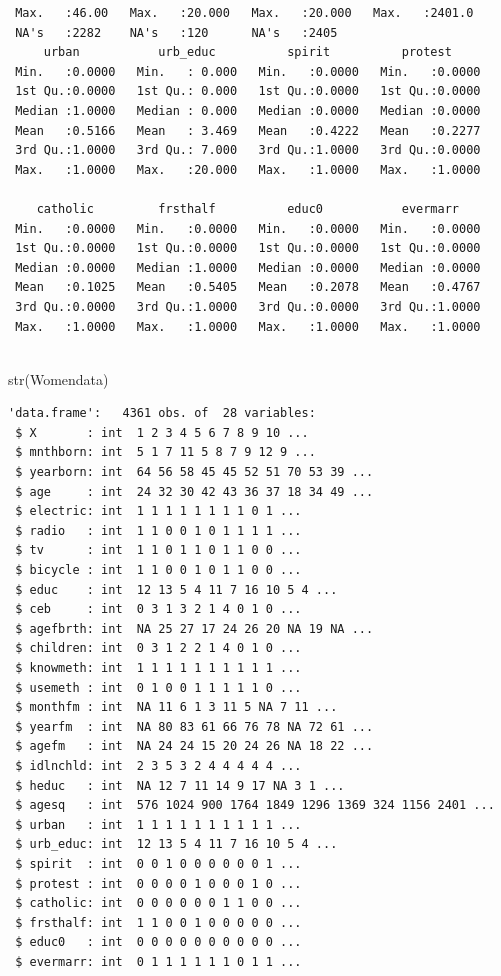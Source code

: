 \documentclass[
  letterpaper,
  DIV=11,
  numbers=noendperiod]{scrartcl}
\newenvironment{Shaded}{\begin{snugshade}}{\end{snugshade}}
\newcommand{\FunctionTok}[1]{\textcolor[rgb]{0.28,0.35,0.67}{#1}}
\newcommand{\NormalTok}[1]{\textcolor[rgb]{0.00,0.23,0.31}{#1}}
\begin{document}
\begin{verbatim}
 Max.   :46.00   Max.   :20.000   Max.   :20.000   Max.   :2401.0  
 NA's   :2282    NA's   :120      NA's   :2405                     
     urban           urb_educ          spirit          protest      
 Min.   :0.0000   Min.   : 0.000   Min.   :0.0000   Min.   :0.0000  
 1st Qu.:0.0000   1st Qu.: 0.000   1st Qu.:0.0000   1st Qu.:0.0000  
 Median :1.0000   Median : 0.000   Median :0.0000   Median :0.0000  
 Mean   :0.5166   Mean   : 3.469   Mean   :0.4222   Mean   :0.2277  
 3rd Qu.:1.0000   3rd Qu.: 7.000   3rd Qu.:1.0000   3rd Qu.:0.0000  
 Max.   :1.0000   Max.   :20.000   Max.   :1.0000   Max.   :1.0000  
                                                                    
    catholic         frsthalf          educ0           evermarr     
 Min.   :0.0000   Min.   :0.0000   Min.   :0.0000   Min.   :0.0000  
 1st Qu.:0.0000   1st Qu.:0.0000   1st Qu.:0.0000   1st Qu.:0.0000  
 Median :0.0000   Median :1.0000   Median :0.0000   Median :0.0000  
 Mean   :0.1025   Mean   :0.5405   Mean   :0.2078   Mean   :0.4767  
 3rd Qu.:0.0000   3rd Qu.:1.0000   3rd Qu.:0.0000   3rd Qu.:1.0000  
 Max.   :1.0000   Max.   :1.0000   Max.   :1.0000   Max.   :1.0000  
                                                                    
\end{verbatim}

\begin{Shaded}
\begin{Highlighting}[]
\FunctionTok{str}\NormalTok{(Womendata)}
\end{Highlighting}
\end{Shaded}

\begin{verbatim}
'data.frame':   4361 obs. of  28 variables:
 $ X       : int  1 2 3 4 5 6 7 8 9 10 ...
 $ mnthborn: int  5 1 7 11 5 8 7 9 12 9 ...
 $ yearborn: int  64 56 58 45 45 52 51 70 53 39 ...
 $ age     : int  24 32 30 42 43 36 37 18 34 49 ...
 $ electric: int  1 1 1 1 1 1 1 1 0 1 ...
 $ radio   : int  1 1 0 0 1 0 1 1 1 1 ...
 $ tv      : int  1 1 0 1 1 0 1 1 0 0 ...
 $ bicycle : int  1 1 0 0 1 0 1 1 0 0 ...
 $ educ    : int  12 13 5 4 11 7 16 10 5 4 ...
 $ ceb     : int  0 3 1 3 2 1 4 0 1 0 ...
 $ agefbrth: int  NA 25 27 17 24 26 20 NA 19 NA ...
 $ children: int  0 3 1 2 2 1 4 0 1 0 ...
 $ knowmeth: int  1 1 1 1 1 1 1 1 1 1 ...
 $ usemeth : int  0 1 0 0 1 1 1 1 1 0 ...
 $ monthfm : int  NA 11 6 1 3 11 5 NA 7 11 ...
 $ yearfm  : int  NA 80 83 61 66 76 78 NA 72 61 ...
 $ agefm   : int  NA 24 24 15 20 24 26 NA 18 22 ...
 $ idlnchld: int  2 3 5 3 2 4 4 4 4 4 ...
 $ heduc   : int  NA 12 7 11 14 9 17 NA 3 1 ...
 $ agesq   : int  576 1024 900 1764 1849 1296 1369 324 1156 2401 ...
 $ urban   : int  1 1 1 1 1 1 1 1 1 1 ...
 $ urb_educ: int  12 13 5 4 11 7 16 10 5 4 ...
 $ spirit  : int  0 0 1 0 0 0 0 0 0 1 ...
 $ protest : int  0 0 0 0 1 0 0 0 1 0 ...
 $ catholic: int  0 0 0 0 0 0 1 1 0 0 ...
 $ frsthalf: int  1 1 0 0 1 0 0 0 0 0 ...
 $ educ0   : int  0 0 0 0 0 0 0 0 0 0 ...
 $ evermarr: int  0 1 1 1 1 1 1 0 1 1 ...
\end{verbatim}
\end{document}
